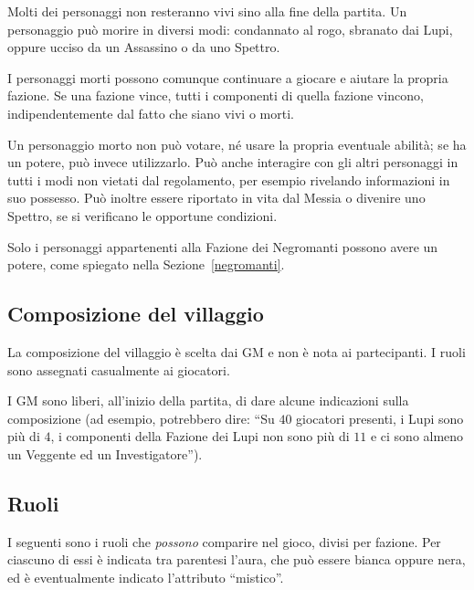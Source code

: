 \documentclass[a4paper,10pt]{article}
\begin{document}
Molti dei personaggi non resteranno vivi sino alla fine della partita. Un personaggio può morire in diversi modi: condannato al rogo, sbranato dai Lupi, oppure ucciso da un Assassino o da uno Spettro.

I personaggi morti possono comunque continuare a giocare e aiutare la propria fazione. Se una fazione vince, tutti i componenti di quella fazione vincono, indipendentemente dal fatto che siano vivi o morti.

Un personaggio morto non può votare, né usare la propria eventuale abilità; se ha un potere, può invece utilizzarlo. Può anche interagire con gli altri personaggi in tutti i modi non vietati dal regolamento, per esempio rivelando informazioni in suo possesso. Può inoltre essere riportato in vita dal Messia o divenire uno Spettro, se si verificano le opportune condizioni.

Solo i personaggi appartenenti alla Fazione dei Negromanti possono avere un potere, come spiegato nella Sezione~\ref{negromanti}.

\subsection{Composizione del villaggio}
 
La composizione del villaggio è scelta dai GM e non è nota ai partecipanti. I ruoli sono assegnati casualmente ai giocatori.

I GM sono liberi, all'inizio della partita, di dare alcune indicazioni sulla composizione (ad esempio, potrebbero dire: ``Su $40$ giocatori presenti, i Lupi sono più di $4$, i componenti della Fazione dei Lupi non sono più di $11$ e ci sono almeno un Veggente ed un Investigatore'').

\subsection{Ruoli}
\label{ruoli}


I seguenti sono i ruoli che \emph{possono} comparire nel gioco, divisi per fazione. Per ciascuno di essi è indicata tra parentesi l'aura, che può essere bianca oppure nera, ed è eventualmente indicato l'attributo ``mistico''.
\end{document}
